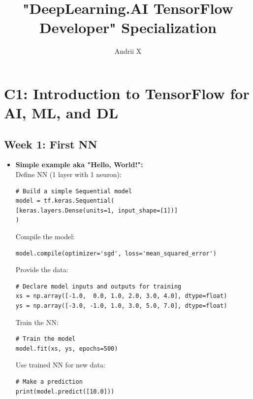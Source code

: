 \documentclass[20pt]{article}
\title{"DeepLearning.AI TensorFlow Developer" Specialization }
\author{ Andrii X }
\date{}
\begin{document}
	\maketitle
	
	\section{C1: Introduction to TensorFlow for AI, ML, and DL}
	\subsection{Week 1: First NN}
	\begin{itemize}
		
		\item \textbf{Simple example aka "Hello, World!":}
		\\
		Define NN (1 layer with 1 neuron):
		\begin{verbatim}
# Build a simple Sequential model
model = tf.keras.Sequential(
[keras.layers.Dense(units=1, input_shape=[1])]
)
		\end{verbatim}
		Compile the model:
		\begin{verbatim}
model.compile(optimizer='sgd', loss='mean_squared_error')
		\end{verbatim}
		Provide the data:
		\begin{verbatim}
# Declare model inputs and outputs for training
xs = np.array([-1.0,  0.0, 1.0, 2.0, 3.0, 4.0], dtype=float)
ys = np.array([-3.0, -1.0, 1.0, 3.0, 5.0, 7.0], dtype=float)	
		\end{verbatim}
		Train the NN:
		\begin{verbatim}
# Train the model
model.fit(xs, ys, epochs=500)	
		\end{verbatim}
		Use trained NN for new data:
		\begin{verbatim}
# Make a prediction
print(model.predict([10.0]))	
		\end{verbatim}
	\end{itemize}
\end{document}
